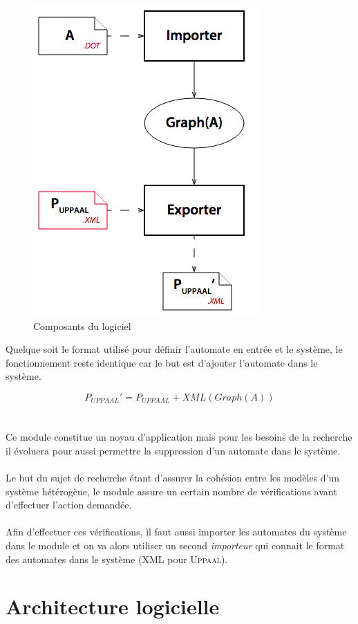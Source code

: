\documentclass[12pt,a4paper]{report}
\begin{document}
\begin{figure}[H]
  \centering
  \includegraphics[scale=0.6]{ressources/archi2.png}
  \caption{Composants du logiciel}
\end{figure}

Quelque soit le format utilisé pour définir l'automate en entrée et le système,
le fonctionnement reste identique car le but est d'ajouter l'automate dans le
système. 

\begin{equation}
P_{UPPAAL}' = P_{UPPAAL} + XML(Graph(A))
\end{equation}
\\\\
Ce module constitue un noyau d'application mais pour les besoins de la
recherche il évoluera pour aussi permettre la suppression d'un automate dans le système.
\\\\
Le but du sujet de recherche étant d'assurer la cohésion entre les modèles 
d'un système hétérogène, le module assure un certain nombre de vérifications
avant d'effectuer l'action demandée. 
\\\\
Afin d'effectuer ces vérifications, ìl
faut aussi importer les automates du système dans le module et 
on va alors utiliser un second \emph{importeur} qui connait le format des automates
dans le système (XML pour \textsc{Uppaal}).

\section{Architecture logicielle}
\end{document}
